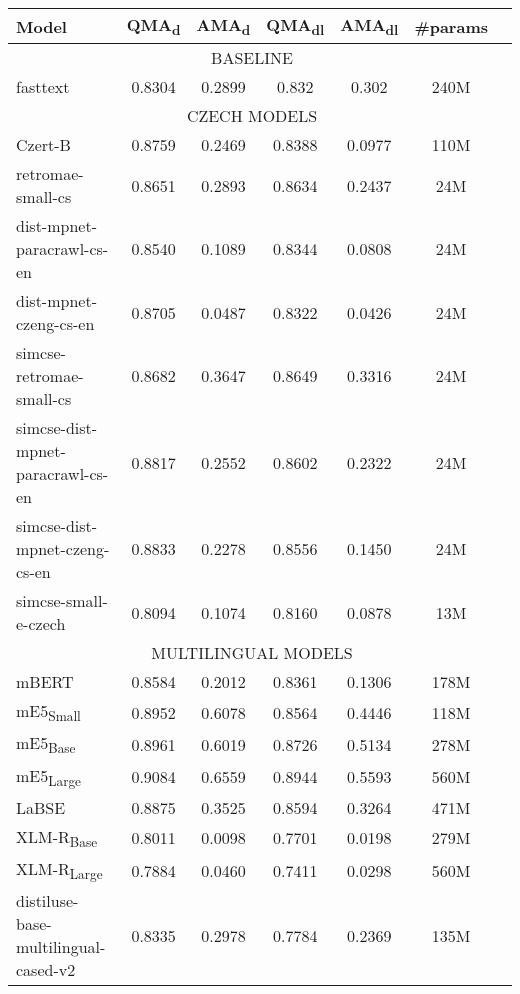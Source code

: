 \begin{table*}[ht!]
    \centering
    \begin{tabular}{lcccccc}
      \toprule
      \textbf{Model} & \textbf{QMA}\textsubscript{d} & \textbf{AMA}\textsubscript{d} & \textbf{QMA}\textsubscript{dl} & \textbf{AMA}\textsubscript{dl} & \textbf{\#params} \\
      \midrule
      \multicolumn{6}{c}{BASELINE} \\
      \hline
      fasttext & 0.8304 & 0.2899 & 0.832 & 0.302 & 240M \\
      \hline
      \multicolumn{6}{c}{CZECH MODELS} \\
      \hline
      Czert-B & 0.8759 & 0.2469 & 0.8388 & 0.0977 & 110M \\
      retromae-small-cs & 0.8651 & 0.2893 & 0.8634 & 0.2437 & 24M \\
      dist-mpnet-paracrawl-cs-en & 0.8540 & 0.1089 & 0.8344 & 0.0808 & 24M \\
      dist-mpnet-czeng-cs-en & 0.8705 & 0.0487 & 0.8322 & 0.0426 & 24M \\
      simcse-retromae-small-cs & 0.8682 & 0.3647 & 0.8649 & 0.3316 & 24M \\
      simcse-dist-mpnet-paracrawl-cs-en & 0.8817 & 0.2552 & 0.8602 & 0.2322 & 24M \\
      simcse-dist-mpnet-czeng-cs-en & 0.8833 & 0.2278 & 0.8556 & 0.1450 & 24M \\
      simcse-small-e-czech & 0.8094 & 0.1074 & 0.8160 & 0.0878 & 13M \\
      \hline
      \multicolumn{6}{c}{MULTILINGUAL MODELS} \\
      \hline
      mBERT & 0.8584 & 0.2012 & 0.8361 & 0.1306 & 178M \\
      mE5\textsubscript{Small} & 0.8952 & 0.6078 & 0.8564 & 0.4446 & 118M \\
      mE5\textsubscript{Base} & 0.8961 & 0.6019 & 0.8726 & 0.5134 & 278M \\
      mE5\textsubscript{Large} & 0.9084 & 0.6559 & 0.8944 & 0.5593 & 560M \\
      LaBSE & 0.8875 & 0.3525 & 0.8594 & 0.3264 & 471M \\
      XLM-R\textsubscript{Base} & 0.8011 & 0.0098 & 0.7701 & 0.0198 & 279M \\
      XLM-R\textsubscript{Large} & 0.7884 & 0.0460 & 0.7411 & 0.0298 & 560M \\
      distiluse-base-multilingual-cased-v2 & 0.8335 & 0.2978 & 0.7784 & 0.2369 & 135M \\

\end{tabular}
\end{table*}
